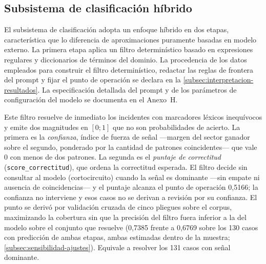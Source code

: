 \subsection{Subsistema de clasificación híbrido}\label{subsec:subsistema-clasificacion}

El subsistema de clasificación adopta un enfoque híbrido en dos etapas, característica que lo diferencia de aproximaciones puramente basadas en modelo externo. La primera etapa aplica un filtro determinístico basado en expresiones regulares y diccionarios de términos del dominio. La procedencia de los datos empleados para construir el filtro determinístico, redactar las reglas de frontera del prompt y fijar el punto de operación se declara en la \autoref{subsec:interpretacion-resultados}. La especificación detallada del prompt y de los parámetros de configuración del modelo se documenta en el Anexo~H.

Este filtro resuelve de inmediato los incidentes con marcadores léxicos inequívocos y emite dos magnitudes en \([0;1]\) que no son probabilidades de acierto. La primera es la \emph{confianza}, índice de fuerza de señal ---margen del sector ganador sobre el segundo, ponderado por la cantidad de patrones coincidentes--- que vale 0 con menos de dos patrones. La segunda es el \emph{puntaje de correctitud} (\texttt{score\_correctitud}), que ordena la correctitud esperada. El filtro decide sin consultar al modelo (cortocircuito) cuando la señal es dominante ---sin empate ni ausencia de coincidencias--- y el puntaje alcanza el punto de operación 0,5166; la confianza no interviene y esos casos no se derivan a revisión por su confianza. El punto se derivó por validación cruzada de cinco pliegues sobre el corpus, maximizando la cobertura sin que la precisión del filtro fuera inferior a la del modelo sobre el conjunto que resuelve (0,7385 frente a 0,6769 sobre los 130 casos con predicción de ambas etapas, ambas estimadas dentro de la muestra; \autoref{subsec:sensibilidad-ajustes}). Equivale a resolver los 131 casos con señal dominante.

